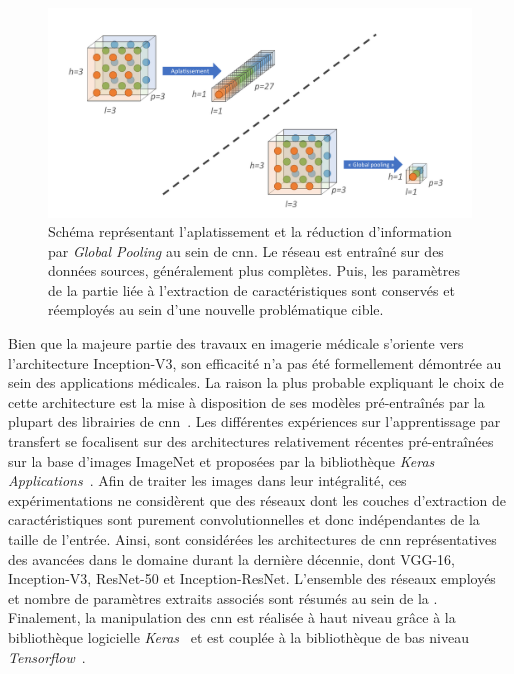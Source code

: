 \begin{figure}[H]
    \centering
    \includegraphics[width=\linewidth]{contents/chapter_5/resources/scheme_global_pooling.pdf}
    \caption{Schéma représentant l'aplatissement et la réduction d'information par \textit{Global Pooling} au sein de \gls{cnn}. Le réseau est entraîné sur des données sources, généralement plus complètes. Puis, les paramètres de la partie liée à l'extraction de caractéristiques sont conservés et réemployés au sein d'une nouvelle problématique cible.}
    \label{fig:scheme_global_pooling}
\end{figure}\par

Bien que la majeure partie des travaux en imagerie médicale s'oriente vers l'architecture Inception-V3, son efficacité n'a pas été formellement démontrée au sein des applications médicales. La raison la plus probable expliquant le choix de cette architecture est la mise à disposition de ses modèles pré-entraînés par la plupart des librairies de \gls{cnn}~\cite{Litjens2017}. Les différentes expériences sur l'apprentissage par transfert se focalisent sur des architectures relativement récentes pré-entraînées sur la base d'images ImageNet et proposées par la bibliothèque \textit{Keras Applications}~\cite{chollet2015a}. Afin de traiter les images dans leur intégralité, ces expérimentations ne considèrent que des réseaux dont les couches d'extraction de caractéristiques sont purement convolutionnelles et donc indépendantes de la taille de l'entrée. Ainsi, sont considérées les architectures de \gls{cnn} représentatives des avancées dans le domaine durant la dernière décennie, dont VGG-16, Inception-V3, ResNet-50 et Inception-ResNet. L'ensemble des réseaux employés et nombre de paramètres extraits associés sont résumés au sein de la . Finalement, la manipulation des \ac{cnn} est réalisée à haut niveau grâce à la bibliothèque logicielle \textit{Keras}~\cite{chollet2015} et est couplée à la bibliothèque de bas niveau \textit{Tensorflow}~\cite{Tensorflow2016}.\par

